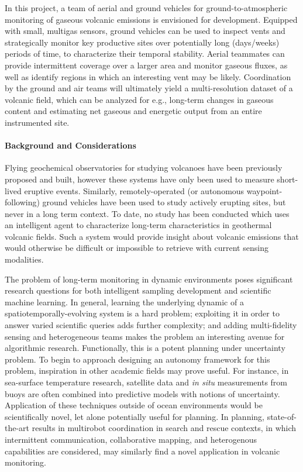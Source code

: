 In this project, a team of aerial and ground vehicles for ground-to-atmospheric monitoring of gaseous volcanic emissions is envisioned for development. Equipped with small, multigas sensors, ground vehicles can be used to inspect vents and strategically monitor key productive sites over potentially long (days/weeks) periods of time, to characterize their temporal stability. Aerial teammates can provide intermittent coverage over a larger area and monitor gaseous fluxes, as well as identify regions in which an interesting vent may be likely. Coordination by the ground and air teams will ultimately yield a multi-resolution dataset of a volcanic field, which can be analyzed for e.g., long-term changes in gaseous content and estimating net gaseous and energetic output from an entire instrumented site.

\paragraph{Background and Considerations}
Flying geochemical observatories for studying volcanoes have been previously proposed and built\autocite{mcgonigle2008unmanned,stix2018using,xi2016constraining,galle2021multi}, however these systems have only been used to measure short-lived eruptive events.
Similarly, remotely-operated (or autonomous waypoint-following) ground vehicles have been used to study actively erupting sites\autocite{muscato2012volcanic}, but never in a long term context.
To date, no study has been conducted which uses an intelligent agent to characterize long-term characteristics in geothermal volcanic fields.
Such a system would provide insight about volcanic emissions that would otherwise be difficult or impossible to retrieve with current sensing modalities.

The problem of long-term monitoring in dynamic environments poses significant research questions for both intelligent sampling development and scientific machine learning. In general, learning the underlying dynamic of a spatiotemporally-evolving system is a hard problem; exploiting it in order to answer varied scientific queries adds further complexity; and adding multi-fidelity sensing and heterogeneous teams makes the problem an interesting avenue for algorithmic research.
Functionally, this is a potent planning under uncertainty problem.
To begin to approach designing an autonomy framework for this problem, inspiration in other academic fields may prove useful. For instance, in sea-surface temperature research, satellite data and \emph{in situ} measurements from buoys are often combined into predictive models with notions of uncertainty\autocite{babaee2020multifidelity}. Application of these techniques outside of ocean environments would be scientifically novel, let alone potentially useful for planning. In planning, state-of-the-art results in multirobot coordination in search and rescue contexts, in which intermittent communication, collaborative mapping, and heterogenous capabilities are considered, may similarly find a novel application in volcanic monitoring\autocite{rizk2019cooperative,queralta2020collaborative}.



